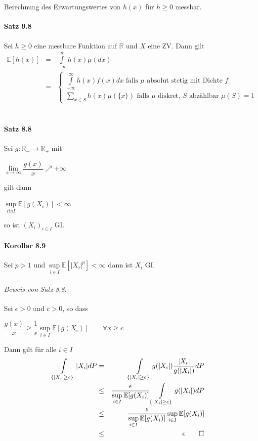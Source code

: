 \documentclass[10pt,a4paper]{report}
\newcommand{\E}{\mathbb{E}}
\newcommand{\R}{\mathbb{R}}
\numberwithin{equation}{section}
\numberwithin{figure}{section}
\theoremstyle{plain}
\theoremstyle{definition}
\theoremstyle{plain}
\theoremstyle{definition}
\theoremstyle{remark}
\theoremstyle{plain}
\begin{document}
$ $\\\\
Berechnung des Erwartungswertes von $h(x)$ für $h \geq 0$ messbar.\\\\
\textbf{Satz 9.8}\\\\
Sei $h\geq 0$ eine messbare Funktion auf $\R$ und $X$ eine ZV. Dann gilt
\begin{eqnarray*}
\E[h(x)] &=& \int\limits_{-\infty}^{\infty} h(x) \mu(dx)\\
&=& \begin{cases}
\int\limits_{-\infty}^\infty h(x)f(x) dx \text{ falls } \mu \text{ absolut stetig mit Dichte } f\\
\sum\limits_{x \in S} h(x)\mu(\{x\}) \text{ falls } \mu \text{ diskret, } S \text{ abzählbar } \mu(S)=1
\end{cases}
\end{eqnarray*}
\\\\
\textbf{Satz 8.8}\\\\
Sei $g:\R_+ \to \R_+$ mit
\begin{center}
$\lim\limits_{x\to \infty} \dfrac{g(x)}{x}\nearrow +\infty$
\end{center}
gilt dann
\begin{center}
$\sup\limits_{i in I} \E[g(X_i)]<\infty$
\end{center}
so ist $(X_i)_{i \in I}$ GI.\\\\
\textbf{Korollar 8.9}\\\\
Sei $p>1$ und $\sup\limits_{i \in I}\E[|X_i|^p]<\infty$ dann ist $X_i$ GI.\\\\
\textit{Beweis von Satz 8.8.}\\\\
Sei $\epsilon > 0$ und $c>0$, so dass 
\begin{center}
$\dfrac{g(x)}{x}\geq \dfrac{1}{\epsilon} \sup\limits_{i \in I}\E[g(X_i)] \qquad \forall x \geq c$
\end{center}
Dann gilt für alle $i \in I$
\begin{eqnarray*}
\int\limits_{\{|X_i|\geq c\}} |X_i|dP &=& \int\limits_{\{|X_i|\geq c\}} g(|X_i|)\dfrac{|X_i|}{g(|X_i|)} dP\\
&\leq &\dfrac{\epsilon}{\sup\limits_{i \in I}\E[g(X_i)]}\int\limits_{\{|X_i|\geq c\}} g(|X_i|)dP\\
&\leq & \dfrac{\epsilon}{\sup\limits_{i \in I}\E[g(X_i)]}\sup\limits_{i \in I}\E[g(X_i)]\\
&\leq & \epsilon \qed
\end{eqnarray*}
\end{document}
